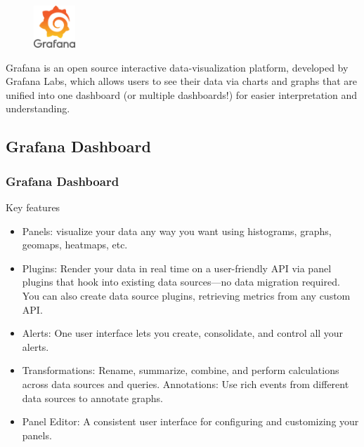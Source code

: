 \documentclass[compress]{beamer}
\begin{document}
\begin{frame}

\begin{figure}
\centering
\includegraphics[height=60px]{./images/Grafana_logo.svg.png}
\end{figure}

Grafana is an open source interactive data-visualization platform, developed by Grafana Labs, which allows users to see their data via charts and graphs that are unified into one dashboard (or multiple dashboards!) for easier interpretation and understanding.

\end{frame}


\subsection{Grafana Dashboard}
\begin{frame}
\frametitle{Grafana Dashboard}

Key features
\begin{itemize}

\item Panels: visualize your data any way you want using histograms, graphs, geomaps, heatmaps, etc.
\item Plugins: Render your data in real time on a user-friendly API via panel plugins that hook into existing data sources—no data migration required. You can also create data source plugins, retrieving metrics from any custom API.
\item Alerts: One user interface lets you create, consolidate, and control all your alerts.
\item Transformations: Rename, summarize, combine, and perform calculations across data sources and queries.
Annotations: Use rich events from different data sources to annotate graphs.
\item Panel Editor: A consistent user interface for configuring and customizing your panels.
\end{itemize}
\end{frame}
\end{document}
